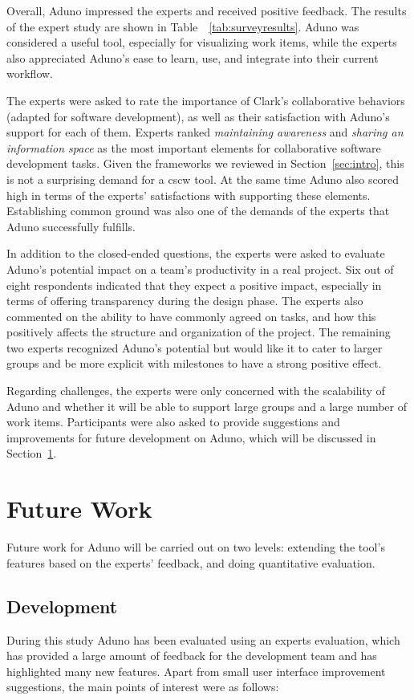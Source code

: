\documentclass[conference]{IEEEtran}
\begin{document}
Overall, Aduno impressed the experts and received positive feedback. The results of the expert study are shown in Table~~\ref{tab:surveyresults}. 
Aduno was considered a useful tool, especially for visualizing work items, while the experts also appreciated Aduno's ease to learn, use, and integrate into their current workflow.

The experts were asked to rate the importance of Clark's \cite{Clark96} collaborative behaviors (adapted for software development), as well as their satisfaction with Aduno's support for each of them. Experts ranked \textit{maintaining awareness} and \textit{sharing an information space} as the most important elements for collaborative software development tasks. Given the frameworks we reviewed in Section~\ref{sec:intro}, this is not a surprising demand for a {\sc cscw} tool. At the same time Aduno also scored high in terms of the experts' satisfactions with supporting these elements. Establishing common ground was also one of the demands of the experts that Aduno successfully fulfills. 

In addition to the closed-ended questions, the experts were asked to evaluate Aduno's potential impact on a team's productivity in a real project. Six out of eight respondents indicated that they expect a positive impact, especially in terms of offering transparency during the design phase. The experts also commented on the ability to have commonly agreed on tasks, and how this positively affects the structure and organization of the project. The remaining two experts recognized Aduno's potential but would like it to cater to larger groups and be more explicit with milestones to have a strong positive effect.

Regarding challenges, the experts were only concerned with the scalability of Aduno and whether it will be able to support large groups and a large number of work items. Participants were also asked to provide suggestions and improvements for future development on Aduno, which will be discussed in Section~\ref{sec:future}.

\section{Future Work}
\label{sec:future}
Future work for Aduno will be carried out on two levels: extending the tool's features based on the experts' feedback, and doing quantitative evaluation. 
\subsection{Development}
During this study Aduno has been evaluated using an experts evaluation, which has provided a large amount of feedback for the development team and has highlighted many new features.  Apart from small user interface improvement suggestions, the main points of interest were as follows:
\end{document}
